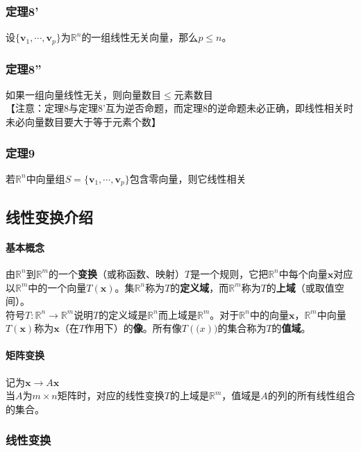 \documentclass{article}
\newcommand{\ve}{\boldsymbol}
\begin{document}
\begin{CJK}{UTF8}{gkai}
\subsubsection{定理8'}
设$\{\ve{v}_1,\cdots,\ve{v}_p\}$为$\mathbb{R}^n$的一组线性无关向量，那么$p\leq n$。\\
\subsubsection{定理8''}
如果一组向量线性无关，则向量数目$\leq$元素数目\\
【注意：定理8与定理8'互为逆否命题，而定理8的逆命题未必正确，即线性相关时未必向量数目要大于等于元素个数】\\

\subsubsection{定理9}
若$\mathbb{R}^n$中向量组$S=\{\ve{v}_1,\cdots,\ve{v}_p\}$包含零向量，则它线性相关\\

\subsection{线性变换介绍}
\paragraph{基本概念\\}
由$\mathbb{R}^n$到$\mathbb{R}^m$的一个\textbf{变换}（或称函数、映射）$T$是一个规则，它把$\mathbb{R}^n$中每个向量$\ve{x}$对应以$\mathbb{R}^m$中的一个向量$T(\ve{x})$。集$\mathbb{R}^n$称为$T$的\textbf{定义域}，而$\mathbb{R}^m$称为$T$的\textbf{上域}（或取值空间）。\\
符号$T:\mathbb{R}^n\to\mathbb{R}^m$说明$T$的定义域是$\mathbb{R}^n$而上域是$\mathbb{R}^m$。对于$\mathbb{R}^n$中的向量$\ve{x}$，$\mathbb{R}^m$中向量$T(\ve{x})$称为$\ve{x}$（在$T$作用下）的\textbf{像}。所有像$T(\ve(x))$的集合称为$T$的\textbf{值域}。
\paragraph{矩阵变换\\}
记为$\ve{x}\to A\ve{x}$\\
当$A$为$m\times n$矩阵时，对应的线性变换$T$的上域是$\mathbb{R}^m$，值域是$A$的列的所有线性组合的集合。\\
\subsubsection{线性变换}

\end{CJK}
\end{document}
